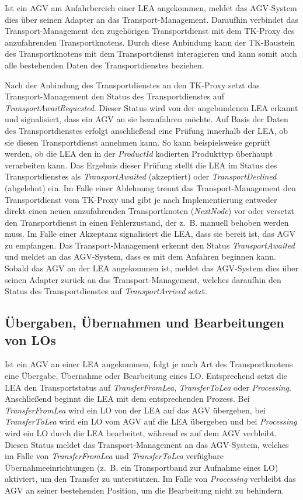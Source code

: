Ist ein AGV am Anfahrbereich einer LEA angekommen, meldet das AGV-System dies über seinen Adapter an das Transport-Management. Daraufhin verbindet das Transport-Management den zugehörigen Transportdienst mit dem TK-Proxy des anzufahrenden Transportknotens. Durch diese Anbindung kann der TK-Baustein des Transportknotens mit dem Transportdienst interagieren und kann somit auch alle bestehenden Daten des Transportdienstes beziehen. 

Nach der Anbindung des Transportdienstes an den TK-Proxy setzt das Transport-Management den Status des Transportdienstes auf \emph{TransportAwaitRequested}. Dieser Status wird von der angebundenen LEA erkannt und signalisiert, dass ein AGV an sie heranfahren möchte. Auf Basis der Daten des Transportdienstes erfolgt anschließend eine Prüfung innerhalb der LEA, ob sie diesen Transportdienst annehmen kann. So kann beispielsweise geprüft werden, ob die LEA den in der \emph{ProductId} kodierten Produkttyp überhaupt verarbeiten kann. Das Ergebnis dieser Prüfung stellt die LEA im Status des Transportdienstes als \emph{TransportAwaited} (akzeptiert) oder \emph{TransportDeclined} (abgelehnt) ein. Im Falle einer Ablehnung trennt das Transport-Management den Transportdienst vom TK-Proxy und gibt je nach Implementierung entweder direkt einen neuen anzufahrenden Transportknoten (\emph{NextNode}) vor oder versetzt den Transportdienst in einen Fehlerzustand, der z.~B. manuell behoben werden muss. Im Falle einer Akzeptanz signalisiert die LEA, dass sie bereit ist, das AGV zu empfangen. Das Transport-Management erkennt den Status \emph{TransportAwaited} und meldet an das AGV-System, dass es mit dem Anfahren beginnen kann. Sobald das AGV an der LEA angekommen ist, meldet das AGV-System dies über seinen Adapter zurück an das Transport-Management, welches daraufhin den Status des Transportdienstes auf \emph{TransportArrived} setzt. 

\subsection{Übergaben, Übernahmen und Bearbeitungen von LOs}
\label{subsec:UbergabeUebernahmeProcessing}

Ist ein AGV an einer LEA angekommen, folgt je nach Art des Transportknotens eine Übergabe, Übernahme oder Bearbeitung eines LO. Entsprechend setzt die LEA den Transportstatus auf \emph{TransferFromLea}, \emph{TransferToLea} oder \emph{Processing}. Anschließend beginnt die LEA mit dem entsprechenden Prozess. Bei \emph{TransferFromLea} wird ein LO von der LEA auf das AGV übergeben, bei \emph{TransferToLea} wird ein LO vom AGV auf die LEA übergeben und bei \emph{Processing} wird ein LO durch die LEA bearbeitet, während es auf dem AGV verbleibt. Diesen Status meldet das Transport-Management an das AGV-System, welches im Falle von \emph{TransferFromLea} und \emph{TransferToLea} verfügbare Übernahmeeinrichtungen (z.~B. ein Transportband zur Aufnahme eines LO) aktiviert, um den Transfer zu unterstützen. Im Falle von \emph{Processing} verbleibt das AGV an seiner bestehenden Position, um die Bearbeitung nicht zu behindern. 

